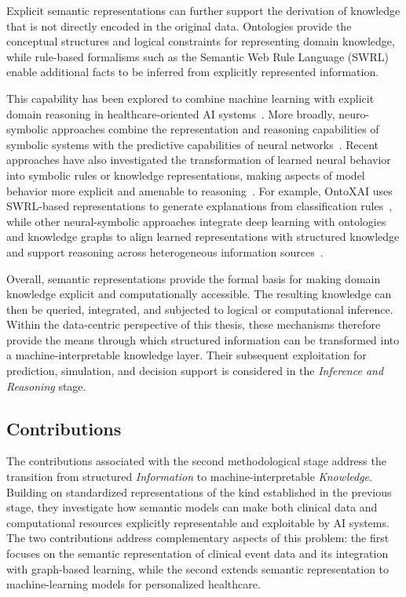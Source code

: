 Explicit semantic representations can further support the derivation of knowledge that is not directly encoded in the original data. Ontologies provide the conceptual structures and logical constraints for representing domain knowledge, while rule-based formalisms such as the Semantic Web Rule Language (SWRL) enable additional facts to be inferred from explicitly represented information.

This capability has been explored to combine machine learning with explicit domain reasoning in healthcare-oriented AI systems~\cite{sharma_ontoxai_2024}. More broadly, neuro-symbolic approaches combine the representation and reasoning capabilities of symbolic systems with the predictive capabilities of neural networks~\cite{garcez_neurosymbolic_2023,bhuyan_neuro-symbolic_2024,yang_give_2024}. Recent approaches have also investigated the transformation of learned neural behavior into symbolic rules or knowledge representations, making aspects of model behavior more explicit and amenable to reasoning~\cite{terziyan_semantic_2026}. For example, OntoXAI uses SWRL-based representations to generate explanations from classification rules~\cite{sharma_ontoxai_2024}, while other neural-symbolic approaches integrate deep learning with ontologies and knowledge graphs to align learned representations with structured knowledge and support reasoning across heterogeneous information sources~\cite{cheng_neural-symbolic_2024}.

Overall, semantic representations provide the formal basis for making domain knowledge explicit and computationally accessible. The resulting knowledge can then be queried, integrated, and subjected to logical or computational inference. Within the data-centric perspective of this thesis, these mechanisms therefore provide the means through which structured information can be transformed into a machine-interpretable knowledge layer. Their subsequent exploitation for prediction, simulation, and decision support is considered in the \emph{Inference and Reasoning} stage.

\subsection{Contributions}
\label{subsec:semantic_contributions}

The contributions associated with the second methodological stage address the transition from structured \emph{Information} to machine-interpretable \emph{Knowledge}. Building on standardized representations of the kind established in the previous stage, they investigate how semantic models can make both clinical data and computational resources explicitly representable and exploitable by AI systems. The two contributions address complementary aspects of this problem: the first focuses on the semantic representation of clinical event data and its integration with graph-based learning, while the second extends semantic representation to machine-learning models for personalized healthcare.

